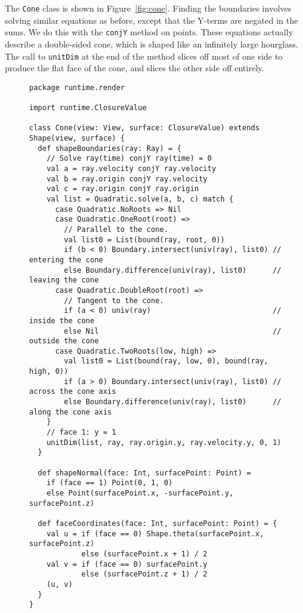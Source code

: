 The \verb!Cone! class is shown in Figure~\ref{fig:cone}.
Finding the boundaries involves solving similar equations as before,
except that the Y-terms are negated in the sums.
We do this with the \verb!conjY! method on points.
These equations actually describe a double-sided cone,
which is shaped like an infinitely large hourglass.
The call to \verb!unitDim! at the end of the method slices off
most of one side to produce the flat face of the cone,
and slices the other side off entirely.

\begin{figure}
\begin{verbatim}
package runtime.render

import runtime.ClosureValue

class Cone(view: View, surface: ClosureValue) extends Shape(view, surface) {
  def shapeBoundaries(ray: Ray) = {
    // Solve ray(time) conjY ray(time) = 0
    val a = ray.velocity conjY ray.velocity
    val b = ray.origin conjY ray.velocity
    val c = ray.origin conjY ray.origin
    val list = Quadratic.solve(a, b, c) match {
      case Quadratic.NoRoots => Nil
      case Quadratic.OneRoot(root) =>
        // Parallel to the cone.
        val list0 = List(bound(ray, root, 0))
        if (b < 0) Boundary.intersect(univ(ray), list0) // entering the cone
        else Boundary.difference(univ(ray), list0)      // leaving the cone
      case Quadratic.DoubleRoot(root) =>
        // Tangent to the cone.
        if (a < 0) univ(ray)                            // inside the cone
        else Nil                                        // outside the cone
      case Quadratic.TwoRoots(low, high) =>
        val list0 = List(bound(ray, low, 0), bound(ray, high, 0))
        if (a > 0) Boundary.intersect(univ(ray), list0) // across the cone axis
        else Boundary.difference(univ(ray), list0)      // along the cone axis
    }
    // face 1: y = 1
    unitDim(list, ray, ray.origin.y, ray.velocity.y, 0, 1)
  }

  def shapeNormal(face: Int, surfacePoint: Point) =
    if (face == 1) Point(0, 1, 0)
    else Point(surfacePoint.x, -surfacePoint.y, surfacePoint.z)

  def faceCoordinates(face: Int, surfacePoint: Point) = {
    val u = if (face == 0) Shape.theta(surfacePoint.x, surfacePoint.z)
            else (surfacePoint.x + 1) / 2
    val v = if (face == 0) surfacePoint.y
            else (surfacePoint.z + 1) / 2
    (u, v)
  }
}
\end{verbatim}
\getcaption
\end{figure}

